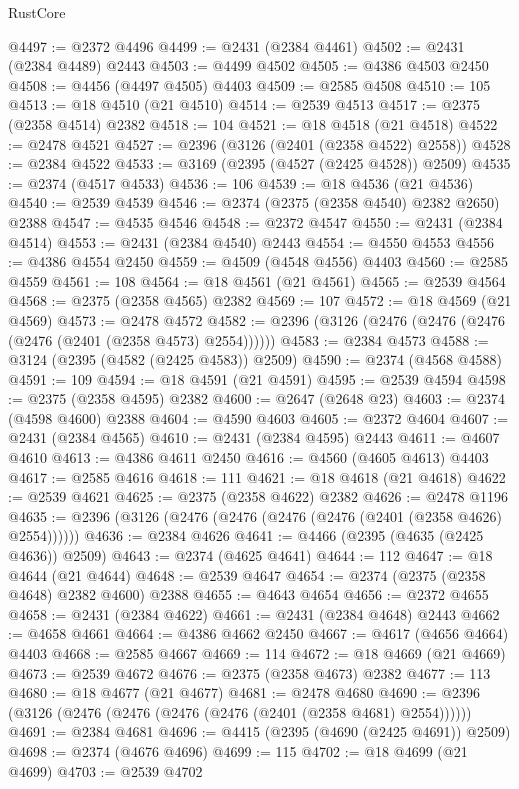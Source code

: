 \begin{lexlean}{RustCore}
\begin{coremodule}
@4497 := @2372 @4496
@4499 := @2431 (@2384 @4461)
@4502 := @2431 (@2384 @4489) @2443
@4503 := @4499 @4502
@4505 := @4386 @4503 @2450
@4508 := @4456 (@4497 @4505) @4403
@4509 := @2585 @4508
@4510 := 105
@4513 := @18 @4510 (@21 @4510)
@4514 := @2539 @4513
@4517 := @2375 (@2358 @4514) @2382
@4518 := 104
@4521 := @18 @4518 (@21 @4518)
@4522 := @2478 @4521
@4527 := @2396 (@3126 (@2401 (@2358 @4522) @2558))
@4528 := @2384 @4522
@4533 := @3169 (@2395 (@4527 (@2425 @4528)) @2509)
@4535 := @2374 (@4517 @4533)
@4536 := 106
@4539 := @18 @4536 (@21 @4536)
@4540 := @2539 @4539
@4546 := @2374 (@2375 (@2358 @4540) @2382 @2650) @2388
@4547 := @4535 @4546
@4548 := @2372 @4547
@4550 := @2431 (@2384 @4514)
@4553 := @2431 (@2384 @4540) @2443
@4554 := @4550 @4553
@4556 := @4386 @4554 @2450
@4559 := @4509 (@4548 @4556) @4403
@4560 := @2585 @4559
@4561 := 108
@4564 := @18 @4561 (@21 @4561)
@4565 := @2539 @4564
@4568 := @2375 (@2358 @4565) @2382
@4569 := 107
@4572 := @18 @4569 (@21 @4569)
@4573 := @2478 @4572
@4582 := @2396 (@3126 (@2476 (@2476 (@2476 (@2476 (@2401 (@2358 @4573) @2554))))))
@4583 := @2384 @4573
@4588 := @3124 (@2395 (@4582 (@2425 @4583)) @2509)
@4590 := @2374 (@4568 @4588)
@4591 := 109
@4594 := @18 @4591 (@21 @4591)
@4595 := @2539 @4594
@4598 := @2375 (@2358 @4595) @2382
@4600 := @2647 (@2648 @23)
@4603 := @2374 (@4598 @4600) @2388
@4604 := @4590 @4603
@4605 := @2372 @4604
@4607 := @2431 (@2384 @4565)
@4610 := @2431 (@2384 @4595) @2443
@4611 := @4607 @4610
@4613 := @4386 @4611 @2450
@4616 := @4560 (@4605 @4613) @4403
@4617 := @2585 @4616
@4618 := 111
@4621 := @18 @4618 (@21 @4618)
@4622 := @2539 @4621
@4625 := @2375 (@2358 @4622) @2382
@4626 := @2478 @1196
@4635 := @2396 (@3126 (@2476 (@2476 (@2476 (@2476 (@2401 (@2358 @4626) @2554))))))
@4636 := @2384 @4626
@4641 := @4466 (@2395 (@4635 (@2425 @4636)) @2509)
@4643 := @2374 (@4625 @4641)
@4644 := 112
@4647 := @18 @4644 (@21 @4644)
@4648 := @2539 @4647
@4654 := @2374 (@2375 (@2358 @4648) @2382 @4600) @2388
@4655 := @4643 @4654
@4656 := @2372 @4655
@4658 := @2431 (@2384 @4622)
@4661 := @2431 (@2384 @4648) @2443
@4662 := @4658 @4661
@4664 := @4386 @4662 @2450
@4667 := @4617 (@4656 @4664) @4403
@4668 := @2585 @4667
@4669 := 114
@4672 := @18 @4669 (@21 @4669)
@4673 := @2539 @4672
@4676 := @2375 (@2358 @4673) @2382
@4677 := 113
@4680 := @18 @4677 (@21 @4677)
@4681 := @2478 @4680
@4690 := @2396 (@3126 (@2476 (@2476 (@2476 (@2476 (@2401 (@2358 @4681) @2554))))))
@4691 := @2384 @4681
@4696 := @4415 (@2395 (@4690 (@2425 @4691)) @2509)
@4698 := @2374 (@4676 @4696)
@4699 := 115
@4702 := @18 @4699 (@21 @4699)
@4703 := @2539 @4702

\end{coremodule}
\end{lexlean}
